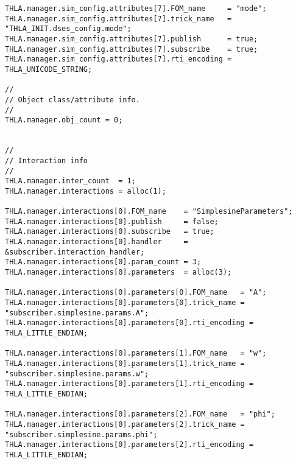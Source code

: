 \begin{lstlisting}[caption={{\tt SIM\_simplesine\_hla\_receiveInt} input file},label={list:complete-receiver-input}]
THLA.manager.sim_config.attributes[7].FOM_name     = "mode";
THLA.manager.sim_config.attributes[7].trick_name   = "THLA_INIT.dses_config.mode";
THLA.manager.sim_config.attributes[7].publish      = true;
THLA.manager.sim_config.attributes[7].subscribe    = true;
THLA.manager.sim_config.attributes[7].rti_encoding = THLA_UNICODE_STRING;

//
// Object class/attribute info.
//
THLA.manager.obj_count = 0;

 
//
// Interaction info
//
THLA.manager.inter_count  = 1;
THLA.manager.interactions = alloc(1);

THLA.manager.interactions[0].FOM_name    = "SimplesineParameters";
THLA.manager.interactions[0].publish     = false;
THLA.manager.interactions[0].subscribe   = true;
THLA.manager.interactions[0].handler     = &subscriber.interaction_handler;
THLA.manager.interactions[0].param_count = 3;
THLA.manager.interactions[0].parameters  = alloc(3);

THLA.manager.interactions[0].parameters[0].FOM_name   = "A";
THLA.manager.interactions[0].parameters[0].trick_name = "subscriber.simplesine.params.A";
THLA.manager.interactions[0].parameters[0].rti_encoding = THLA_LITTLE_ENDIAN;

THLA.manager.interactions[0].parameters[1].FOM_name   = "w";
THLA.manager.interactions[0].parameters[1].trick_name = "subscriber.simplesine.params.w";
THLA.manager.interactions[0].parameters[1].rti_encoding = THLA_LITTLE_ENDIAN;

THLA.manager.interactions[0].parameters[2].FOM_name   = "phi";
THLA.manager.interactions[0].parameters[2].trick_name = "subscriber.simplesine.params.phi";
THLA.manager.interactions[0].parameters[2].rti_encoding = THLA_LITTLE_ENDIAN;
\end{lstlisting}
